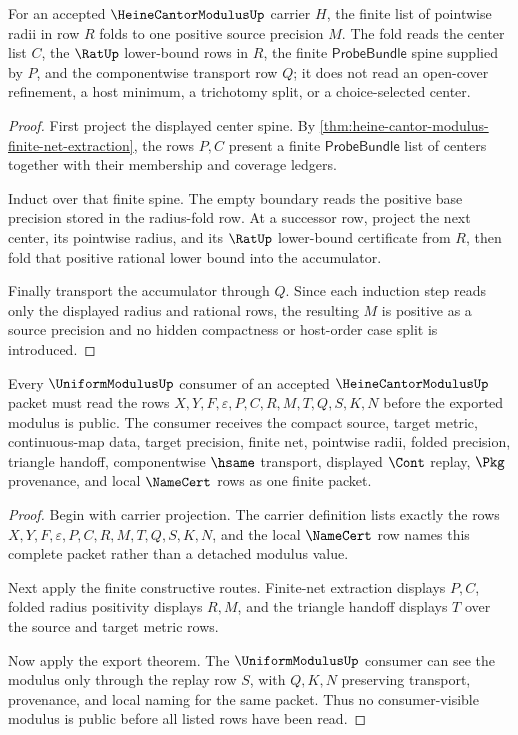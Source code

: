 \begin{theorem}
\label{thm:heine-cantor-modulus-folded-radius-positive}
For an accepted $\HeineCantorModulusUp$ carrier $H$, the finite list of
pointwise radii in row $R$ folds to one positive source precision $M$. The
fold reads the center list $C$, the $\RatUp$ lower-bound rows in $R$, the
finite $\mathsf{ProbeBundle}$ spine supplied by $P$, and the componentwise
transport row $Q$; it does not read an open-cover refinement, a host minimum,
a trichotomy split, or a choice-selected center.
\end{theorem}
\begin{proof}
First project the displayed center spine. By
\autoref{thm:heine-cantor-modulus-finite-net-extraction}, the rows $P,C$
present a finite $\mathsf{ProbeBundle}$ list of centers together with their
membership and coverage ledgers.

Induct over that finite spine. The empty boundary reads the positive base
precision stored in the radius-fold row. At a successor row, project the next
center, its pointwise radius, and its $\RatUp$ lower-bound certificate from
$R$, then fold that positive rational lower bound into the accumulator.

Finally transport the accumulator through $Q$. Since each induction step reads
only the displayed radius and rational rows, the resulting $M$ is positive as a
source precision and no hidden compactness or host-order case split is
introduced.
\end{proof}

\begin{theorem}
\label{thm:heine-cantor-modulus-uniform-consumer-projection}
Every $\UniformModulusUp$ consumer of an accepted $\HeineCantorModulusUp$
packet must read the rows $X,Y,F,\varepsilon,P,C,R,M,T,Q,S,K,N$ before the
exported modulus is public. The consumer receives the compact source, target
metric, continuous-map data, target precision, finite net, pointwise radii,
folded precision, triangle handoff, componentwise $\hsame$ transport,
displayed $\Cont$ replay, $\Pkg$ provenance, and local $\NameCert$ rows as one
finite packet.
\end{theorem}
\begin{proof}
Begin with carrier projection. The carrier definition lists exactly the rows
$X,Y,F,\varepsilon,P,C,R,M,T,Q,S,K,N$, and the local $\NameCert$ row names this
complete packet rather than a detached modulus value.

Next apply the finite constructive routes. Finite-net extraction displays
$P,C$, folded radius positivity displays $R,M$, and the triangle handoff
displays $T$ over the source and target metric rows.

Now apply the export theorem. The $\UniformModulusUp$ consumer can see the
modulus only through the replay row $S$, with $Q,K,N$ preserving transport,
provenance, and local naming for the same packet. Thus no consumer-visible
modulus is public before all listed rows have been read.
\end{proof}

